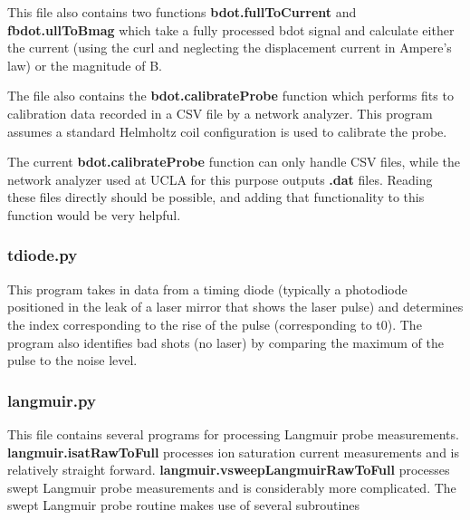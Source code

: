 \documentclass[12pt]{article}
\newcommand{\loc}[1]{{\bf \fontfamily{pcr}\selectfont #1}}
\newcommand{\todo}[1]{ \begin{tcolorbox} \centering  #1 \end{tcolorbox}}
\begin{document}
This file also contains two functions \loc{bdot.fullToCurrent} and \loc{fbdot.ullToBmag} which take a fully processed bdot signal and calculate either the current (using the curl and neglecting the displacement current in Ampere's law) or the magnitude of B. 

The file also contains the \loc{bdot.calibrateProbe} function which performs fits to calibration data recorded in a CSV file by a network analyzer. This program assumes a standard Helmholtz coil configuration is used to calibrate the probe. 

\todo{The current \loc{bdot.calibrateProbe} function can only handle CSV files, while the network analyzer used at UCLA for this purpose outputs \loc{.dat} files. Reading these files directly should be possible, and adding that functionality to this function would be very helpful.}

\subsubsection{\loc{tdiode.py}}

This program takes in data from a timing diode (typically a photodiode positioned in the leak of a laser mirror that shows the laser pulse) and determines the index corresponding to the rise of the pulse (corresponding to t0). The program also identifies bad shots (no laser) by comparing the maximum of the pulse to the noise level. 


\subsubsection{\loc{langmuir.py}}

This file contains several programs for processing Langmuir probe measurements. \loc{langmuir.isatRawToFull} processes ion saturation current measurements and is relatively straight forward. \loc{langmuir.vsweepLangmuirRawToFull} processes swept Langmuir probe measurements and is considerably more complicated. The swept Langmuir probe routine makes use of several subroutines
\end{document}
